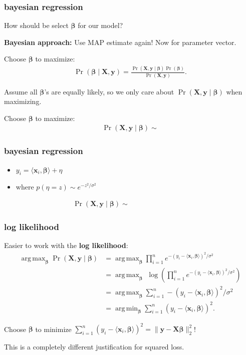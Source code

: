 \documentclass[handout,compress]{beamer}
\newcommand{\bs}[1]{\boldsymbol{#1}}
\newcommand{\bv}[1]{\mathbf{#1}}
\DeclareMathOperator*{\argmin}{arg\,min}
\DeclareMathOperator*{\argmax}{arg\,max}
\begin{document}
\begin{frame}
	\frametitle{bayesian regression}
	\begin{center}
		\alert{How should be select $\bs{\beta}$ for our model?}
	\end{center}
		\textbf{Bayesian approach:} Use MAP estimate again! Now for parameter vector.
		
		 Choose $\bs{\beta}$ to  maximize:
		\begin{align*}
		\Pr(\bs{\beta} \mid \bv{X},\bv{y} )  = \frac{\Pr(\bv{X},\bv{y} \mid  \bs{\beta} ) \Pr(\bs{\beta} )  }{\Pr(\bv{X},\bv{y} )}.
		\end{align*}
		
		Assume all $\bs{\beta}$'s are equally likely, so we only care about $\Pr(\bv{X},\bv{y} \mid  \bs{\beta} )$  when maximizing.
		
		Choose $\bs{\beta}$ to  maximize:
		\begin{align*}
		\Pr(\bv{X},\bv{y}  \mid  \bs{\beta} ) \sim 
		\end{align*}
\end{frame}

\begin{frame}[t]
	\frametitle{bayesian regression}
	\begin{itemize}
		\item $y_i = \langle \bv{x}_i, \bs{\beta} \rangle+ \eta$
		\item where $p(\eta = z) \sim e^{-z^2/\sigma^2}$
		\vspace{1em}
		
		\begin{align*}
		\Pr(\bv{X},\bv{y}  \mid  \bs{\beta} ) \sim \hspace{10em}
		\end{align*}
	\end{itemize}
\end{frame}

\begin{frame}
	\frametitle{log likelihood}
	Easier to work with the \alert{\textbf{log likelihood}}:
	\begin{align*}
	\argmax_{\bs{\beta}}  \Pr(\bv{X},\bv{y}  \mid  \bs{\beta}) &=\argmax_{\bs{\beta}} \prod_{i=1}^n e^{-(y_i - \langle \bv{x}_i, \bs{\beta} \rangle)^2/\sigma^2} \\ 
	&= \argmax_{\bs{\beta}}\,\, \log\left(\prod_{i=1}^n e^{-(y_i - \langle \bv{x}_i, \bs{\beta} \rangle)^2/\sigma^2} \right)\\
	&= \argmax_{\bs{\beta}}  \sum_{i=1}^n -(y_i - \langle \bv{x}_i, \bs{\beta} \rangle)^2/\sigma^2\\
	&= \argmin_{\bs{\beta}}  \sum_{i=1}^n (y_i - \langle \bv{x}_i, \bs{\beta} \rangle)^2.
	\end{align*}
	
	Choose $\bs{\beta}$ to minimize $\sum_{i=1}^n (y_i - \langle \bv{x}_i, \bs{\beta} \rangle)^2 = \|\bv{y} - \bv{X}\bs{\beta}\|_2^2$!
	
	
	\alert{This is a completely different justification for squared loss.}
\end{frame}
\end{document}
